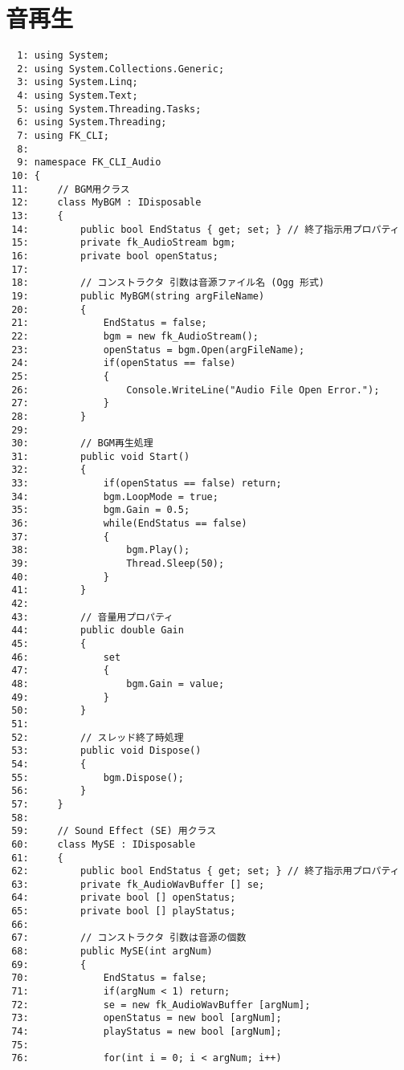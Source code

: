 \section{音再生}
\begin{breakbox}
\begin{small}
\begin{verbatim}
  1: using System;
  2: using System.Collections.Generic;
  3: using System.Linq;
  4: using System.Text;
  5: using System.Threading.Tasks;
  6: using System.Threading;
  7: using FK_CLI;
  8: 
  9: namespace FK_CLI_Audio
 10: {
 11:     // BGM用クラス
 12:     class MyBGM : IDisposable
 13:     {
 14:         public bool EndStatus { get; set; } // 終了指示用プロパティ
 15:         private fk_AudioStream bgm;
 16:         private bool openStatus;
 17: 
 18:         // コンストラクタ 引数は音源ファイル名 (Ogg 形式)
 19:         public MyBGM(string argFileName)
 20:         {
 21:             EndStatus = false;
 22:             bgm = new fk_AudioStream();
 23:             openStatus = bgm.Open(argFileName);
 24:             if(openStatus == false)
 25:             {
 26:                 Console.WriteLine("Audio File Open Error.");
 27:             }
 28:         }
 29: 
 30:         // BGM再生処理
 31:         public void Start()
 32:         {
 33:             if(openStatus == false) return;
 34:             bgm.LoopMode = true;
 35:             bgm.Gain = 0.5;
 36:             while(EndStatus == false)
 37:             {
 38:                 bgm.Play();
 39:                 Thread.Sleep(50);
 40:             }
 41:         }
 42: 
 43:         // 音量用プロパティ
 44:         public double Gain
 45:         {
 46:             set
 47:             {
 48:                 bgm.Gain = value;
 49:             }
 50:         }
 51: 
 52:         // スレッド終了時処理
 53:         public void Dispose()
 54:         {
 55:             bgm.Dispose();
 56:         }
 57:     }
 58: 
 59:     // Sound Effect (SE) 用クラス
 60:     class MySE : IDisposable
 61:     {
 62:         public bool EndStatus { get; set; } // 終了指示用プロパティ
 63:         private fk_AudioWavBuffer [] se;
 64:         private bool [] openStatus;
 65:         private bool [] playStatus;
 66: 
 67:         // コンストラクタ 引数は音源の個数
 68:         public MySE(int argNum)
 69:         {
 70:             EndStatus = false;
 71:             if(argNum < 1) return;
 72:             se = new fk_AudioWavBuffer [argNum];
 73:             openStatus = new bool [argNum];
 74:             playStatus = new bool [argNum];
 75: 
 76:             for(int i = 0; i < argNum; i++)

\end{verbatim}
\end{small}
\end{breakbox}
